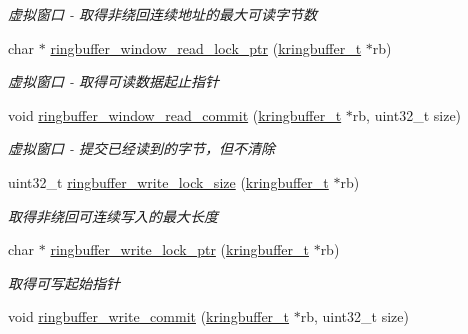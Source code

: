 \begin{DoxyCompactItemize}
\begin{DoxyCompactList}\small\item\em 虚拟窗口 -\/ 取得非绕回连续地址的最大可读字节数 \end{DoxyCompactList}\item 
char $\ast$ \hyperlink{a00091_ad11b70346a4c8b62b21b04d5b064aab4_ad11b70346a4c8b62b21b04d5b064aab4}{ringbuffer\+\_\+window\+\_\+read\+\_\+lock\+\_\+ptr} (\hyperlink{a00056_a66d91f7667db1f0b2983fc25e1a20f1c_a66d91f7667db1f0b2983fc25e1a20f1c}{kringbuffer\+\_\+t} $\ast$rb)
\begin{DoxyCompactList}\small\item\em 虚拟窗口 -\/ 取得可读数据起止指针 \end{DoxyCompactList}\item 
void \hyperlink{a00091_a97a9944a61a5323f80fb07f0fa4d8ff5_a97a9944a61a5323f80fb07f0fa4d8ff5}{ringbuffer\+\_\+window\+\_\+read\+\_\+commit} (\hyperlink{a00056_a66d91f7667db1f0b2983fc25e1a20f1c_a66d91f7667db1f0b2983fc25e1a20f1c}{kringbuffer\+\_\+t} $\ast$rb, uint32\+\_\+t size)
\begin{DoxyCompactList}\small\item\em 虚拟窗口 -\/ 提交已经读到的字节，但不清除 \end{DoxyCompactList}\item 
uint32\+\_\+t \hyperlink{a00091_aa5b19df813e8df494a77c9a849ebffdd_aa5b19df813e8df494a77c9a849ebffdd}{ringbuffer\+\_\+write\+\_\+lock\+\_\+size} (\hyperlink{a00056_a66d91f7667db1f0b2983fc25e1a20f1c_a66d91f7667db1f0b2983fc25e1a20f1c}{kringbuffer\+\_\+t} $\ast$rb)
\begin{DoxyCompactList}\small\item\em 取得非绕回可连续写入的最大长度 \end{DoxyCompactList}\item 
char $\ast$ \hyperlink{a00091_af34961f27369651af41a96f736a813af_af34961f27369651af41a96f736a813af}{ringbuffer\+\_\+write\+\_\+lock\+\_\+ptr} (\hyperlink{a00056_a66d91f7667db1f0b2983fc25e1a20f1c_a66d91f7667db1f0b2983fc25e1a20f1c}{kringbuffer\+\_\+t} $\ast$rb)
\begin{DoxyCompactList}\small\item\em 取得可写起始指针 \end{DoxyCompactList}\item 
void \hyperlink{a00091_a92305d9585adf8fe35c059b04f635d30_a92305d9585adf8fe35c059b04f635d30}{ringbuffer\+\_\+write\+\_\+commit} (\hyperlink{a00056_a66d91f7667db1f0b2983fc25e1a20f1c_a66d91f7667db1f0b2983fc25e1a20f1c}{kringbuffer\+\_\+t} $\ast$rb, uint32\+\_\+t size)

\end{DoxyCompactItemize}
